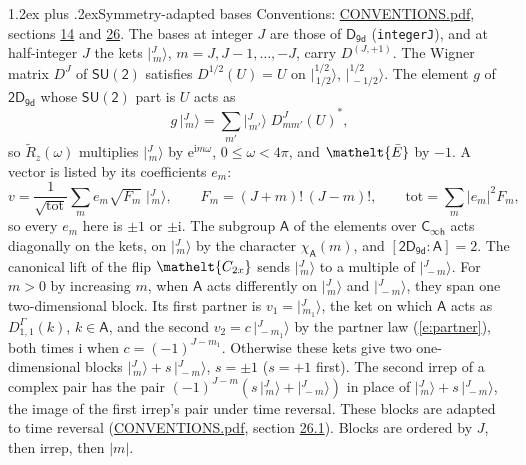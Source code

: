 \documentclass[10pt,a4paper]{article}
\makeatletter
\renewcommand\section{\@startsection{section}{1}{\z@}{-3ex plus -1ex minus -.2ex}%
  {1.2ex plus .2ex}{\normalfont\large\sffamily\bfseries\color{parttitle}}}
\numberwithin{equation}{section}
\newcommand{\eltfont}[1]{{\let\sigma\eltsigma\mathelt{#1}}}
\newcommand{\grp}[1]{\mathsf{#1}}
\newcommand{\elt}[1]{\eltfont{#1}}
\newcommand{\grpindex}[2]{[#1 : #2]}
\newcommand{\iunit}{\mathrm{i}}
\newcommand{\expe}{\mathrm{e}}
\newcommand{\irrJp}[2]{D^{(#1,#2)}}
\newcommand{\repD}[1]{D^{#1}}
\newcommand{\wignerD}[1]{D^{#1}}
\newcommand{\chiA}{\chi_{\grp{A}}}
\newcommand{\conj}[1]{{#1}^{*}}
\newcommand{\jm}[2]{\bigl\lvert{}^{#1}_{\,#2}\bigr\rangle}
\newcommand{\barred}[1]{\bar{#1}}
\newcommand{\lift}[1]{\tilde{#1}}
\makeatother
\begin{document}
\section{Symmetry-adapted bases}\label{s:bases}
Conventions: \href{../../CONVENTIONS.pdf}{CONVENTIONS.pdf}, sections \href{../../../rotation/CONVENTIONS.pdf\#conv.14}{14} and \href{../../CONVENTIONS.pdf\#conv.26}{26}.
\leavevmode\label{n:index.m}\label{n:vector.ket}The bases at integer $J$ are those of \href{../../../rotation/data/pdf/D9d.pdf}{$\grp{D_{9d}}$} (\texttt{integerJ}), and at half-integer $J$ the kets $\jm{J}{m}$, $m = J, J-1, \dots, -J$, carry $\irrJp{J}{+1}$. \label{n:matrix.wigner}The Wigner matrix $\wignerD{J}$ of $\grp{SU(2)}$ satisfies $\wignerD{1/2}(U) = U$ on $\jm{1/2}{1/2}$, $\jm{1/2}{-1/2}$. The element $g$ of $\grp{2D_{9d}}$ whose $\grp{SU(2)}$ part is $U$ acts as
\begin{equation}\label{e:action}g\,\jm{J}{m} = \sum_{m'} \jm{J}{m'}\; \conj{\wignerD{J}_{m m'}(U)},\end{equation}
so $\lift{R}_{z}(\omega)$ multiplies $\jm{J}{m}$ by $\expe^{\iunit m\omega}$, $0 \le \omega < 4\pi$, and $\elt{\barred{E}}$ by $-1$. \label{n:index.ketcoefficient}\label{n:vector.basis.symmetry}\label{n:index.ketweight}\label{n:index.total}A vector is listed by its coefficients $e_m$:
\begin{equation}\label{e:ket}v = \frac{1}{\sqrt{\mathrm{tot}}}\sum_m e_m\sqrt{F_m}\;\jm{J}{m},\qquad F_m = (J+m)!\,(J-m)!,\qquad \mathrm{tot} = \sum_m |e_m|^2F_m,\end{equation}
so every $e_m$ here is $\pm 1$ or $\pm\iunit$.
\leavevmode\label{n:group.A}\label{n:function.character.abelian}The subgroup $\grp{A}$ of the elements over $\grp{C_{\infty h}}$ acts diagonally on the kets, on $\jm{J}{m}$ by the character $\chiA(m)$, and $\grpindex{\grp{2D_{9d}}}{\grp{A}} = 2$. The canonical lift of the flip $\elt{C_{2x}}$ sends $\jm{J}{m}$ to a multiple of $\jm{J}{-m}$. For $m > 0$ by increasing $m$, when $\grp{A}$ acts differently on $\jm{J}{m}$ and $\jm{J}{-m}$, they span one two-dimensional block. \label{n:index.partner.sign}Its first partner is $v_1 = \jm{J}{m_1}$, the ket on which $\grp{A}$ acts as $\repD{\Gamma}_{1,1}(k)$, $k \in \grp{A}$, and the second $v_2 = c\,\jm{J}{-m_1}$ by the partner law (\ref{e:partner}), both times $\iunit$ when $c = (-1)^{J-m_1}$. \label{n:index.pair.sign}Otherwise these kets give two one-dimensional blocks $\jm{J}{m} + s\,\jm{J}{-m}$, $s = \pm 1$ ($s = +1$ first). The second irrep of a complex pair has the pair $(-1)^{J-m}(s\,\jm{J}{m} + \jm{J}{-m})$ in place of $\jm{J}{m} + s\,\jm{J}{-m}$, the image of the first irrep's pair under time reversal. These blocks are adapted to time reversal (\href{../../CONVENTIONS.pdf}{CONVENTIONS.pdf}, section \href{../../CONVENTIONS.pdf\#conv.26.1}{26.1}). Blocks are ordered by $J$, then irrep, then $|m|$.
\end{document}
